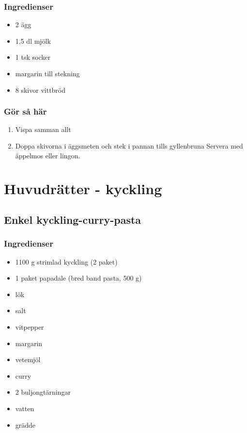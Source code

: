 \documentclass[a4paper,11pt,twocolumn]{article}
\begin{document}
\subsubsection*{Ingredienser}
\begin{itemize}[noitemsep]
    \item 2 ägg
    \item 1,5 dl mjölk
    \item 1 tsk socker
    \item margarin till stekning
    \item 8 skivor vittbröd
\end{itemize}
\subsubsection*{Gör så här}
\begin{enumerate}[label=\arabic*.]
    \item Vispa samman allt
    \item Doppa skivorna i äggsmeten och stek i pannan tills gyllenbruna
Servera med äppelmos eller lingon.
\end{enumerate}



\section{Huvudrätter - kyckling}



\subsection{Enkel kyckling-curry-pasta}
\subsubsection*{Ingredienser}
\begin{itemize}[noitemsep]
    \item 1100 g strimlad kyckling (2 paket)
    \item 1 paket papadale (bred band pasta, 500 g)
    \item lök
    \item salt
    \item vitpepper
    \item margarin
    \item vetemjöl
    \item curry
    \item 2 buljongtärningar
    \item vatten
    \item grädde
\end{itemize}
\end{document}
